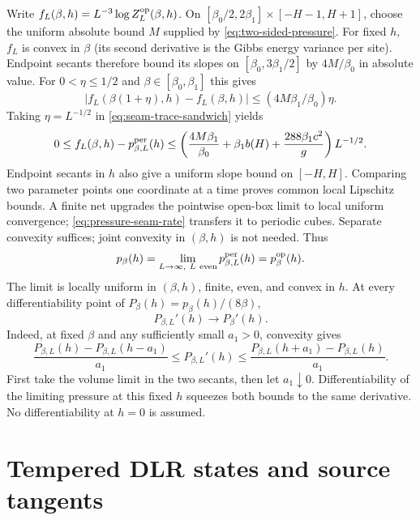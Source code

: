 \documentclass[11pt]{article}
\numberwithin{equation}{section}
\theoremstyle{definition}
\begin{document}
Write $f_L(\beta,h)=L^{-3}\log Z_L^{\rm op}(\beta,h)$.
On $[\beta_0/2,2\beta_1]\times[-H-1,H+1]$, choose the uniform absolute
bound $M$ supplied by \eqref{eq:two-sided-pressure}.  For fixed $h$,
$f_L$ is convex in $\beta$ (its second derivative is the Gibbs energy
variance per site).  Endpoint secants therefore bound its slopes on
$[\beta_0,3\beta_1/2]$ by $4M/\beta_0$ in absolute value.
For $0<\eta\leq1/2$ and $\beta\in[\beta_0,\beta_1]$ this gives
\[
 |f_L(\beta(1+\eta),h)-f_L(\beta,h)|
 \leq(4M\beta_1/\beta_0)\eta.
\]
Taking $\eta=L^{-1/2}$ in \eqref{eq:seam-trace-sandwich} yields
\begin{equation}
 0\leq f_L(\beta,h)-p_{\beta,L}^{\rm per}(h)
 \leq\left(\frac{4M\beta_1}{\beta_0}+\beta_1b(H)
                    +\frac{288\beta_1c^2}{g}\right)L^{-1/2}.
 \label{eq:pressure-seam-rate}
\end{equation}
Endpoint secants in $h$ also give a uniform slope bound on $[-H,H]$.
Comparing two parameter points one coordinate at a time proves common
local Lipschitz bounds.  A finite net upgrades the pointwise open-box
limit to local uniform convergence; \eqref{eq:pressure-seam-rate} transfers
it to periodic cubes.  Separate convexity suffices; joint convexity in
$(\beta,h)$ is not needed.  Thus
\begin{equation}
 p_\beta(h)=\lim_{L\to\infty,\ L\ {\rm even}}p_{\beta,L}^{\rm per}(h)
                  =p_\beta^{\rm op}(h). \label{eq:pressure-limit}
\end{equation}
The limit is locally uniform in $(\beta,h)$, finite, even, and convex in $h$.
At every differentiability point of $P_\beta(h)=p_\beta(h)/(8\beta)$,
\begin{equation}
 P_{\beta,L}'(h)\longrightarrow P_\beta'(h).
\label{eq:derivative-limit}
\end{equation}
Indeed, at fixed $\beta$ and any sufficiently small $a_1>0$, convexity gives
\[
 \frac{P_{\beta,L}(h)-P_{\beta,L}(h-a_1)}{a_1}
 \leq P_{\beta,L}'(h)
 \leq\frac{P_{\beta,L}(h+a_1)-P_{\beta,L}(h)}{a_1}.
\]
First take the volume limit in the two secants, then let $a_1\downarrow0$.
Differentiability of the limiting pressure at this fixed $h$ squeezes both
bounds to the same derivative.  No differentiability at $h=0$ is assumed.

\section{Tempered DLR states and source tangents}
\label{sec:dlr}
\end{document}
